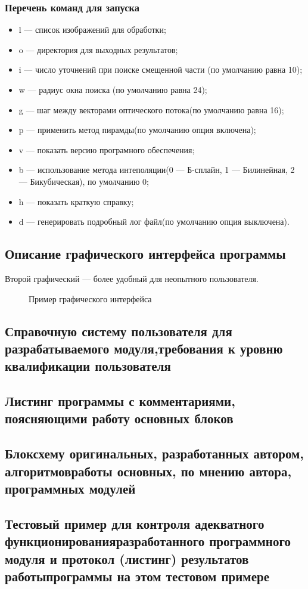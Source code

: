 \subsubsection{Перечень команд для запуска}
\begin{itemize}
\item l — список изображений для обработки;
\item o — директория для выходных результатов;
\item i — число уточнений при поиске смещенной части (по умолчанию равна 10);
\item w — радиус окна поиска (по умолчанию равна 24);
\item g — шаг между векторами оптического потока(по умолчанию равна 16);
\item p — применить метод пирамды(по умолчанию опция включена);
\item v — показать версию програмного обеспечения;
\item b — использование метода интеполяции(0 — Б-сплайн, 1 — Билинейная, 2 — Бикубическая), по умолчанию 0;
\item h — показать краткую справку;
\item d — генерировать подробный лог файл(по умолчанию опция выключена).
\end{itemize}

\subsection{Описание графического интерфейса программы}
Второй графический — более удобный для неопытного пользователя. 

\begin{figure}[ht]
\caption{Пример графического интерфейса}
\label{pic:gui_scr}
\end{figure}

\subsection{Справочную систему пользователя для разрабатываемого модуля,требования к уровню квалификации пользователя}
\subsection{Листинг программы с комментариями, поясняющими работу основных блоков}
\subsection{Блоксхему оригинальных, разработанных автором, алгоритмовработы основных, по мнению автора, программных модулей}
\subsection{Тестовый пример для контроля адекватного функционированияразработанного программного модуля и протокол (листинг) результатов работыпрограммы на этом тестовом примере}